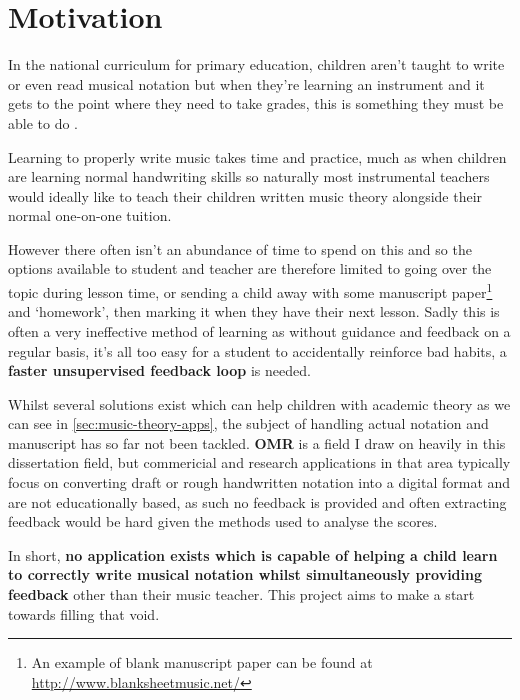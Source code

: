 \section{Motivation}

In the national curriculum for primary education, children aren't taught to write or even read musical notation \parencite{Attai5} but when they're learning an instrument and it gets to the point where they need to take grades, this is something they must be able to do \parencite{whyMusicTheory}.

Learning to properly write music takes time and practice, much as when children are learning normal handwriting skills so naturally most instrumental teachers would ideally like to teach their children written music theory alongside their normal one-on-one tuition.

However there often isn't an abundance of time to spend on this and so the options available to student and teacher are therefore limited to going over the topic during lesson time, or sending a child away with some manuscript paper\footnote{An example of blank manuscript paper can be found at \url{http://www.blanksheetmusic.net/}} and `homework', then marking it when they have their next lesson. Sadly this is often a very ineffective method of learning as without guidance and feedback on a regular basis, it's all too easy for a student to accidentally reinforce bad habits, a \textbf{faster unsupervised feedback loop} is needed.

Whilst several solutions exist which can help children with academic theory as we can see in \cref{sec:music-theory-apps}, the subject of handling actual notation and manuscript has so far not been tackled. \textbf{\acrfull{OMR}} is a field I draw on heavily in this dissertation field, but commericial and research applications in that area typically focus on converting draft or rough handwritten notation into a digital format and are not educationally based, as such no feedback is provided and often extracting feedback would be hard given the methods used to analyse the scores.

In short, \textbf{no application exists which is capable of helping a child learn to correctly write musical notation whilst simultaneously providing feedback} other than their music teacher. This project aims to make a start towards filling that void.

%
